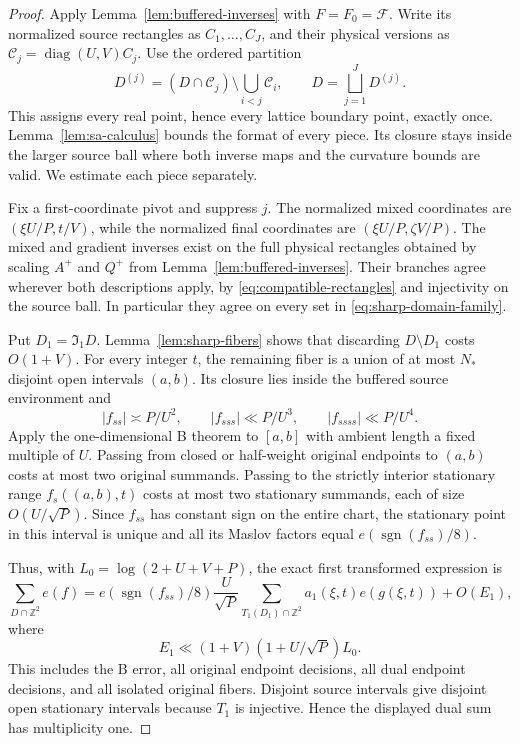 \documentclass[11pt,a4paper]{article}
\numberwithin{equation}{section}
\theoremstyle{remark}
\newcommand{\Z}{\mathbb Z}
\begin{document}
\begin{proof}
Apply Lemma~\ref{lem:buffered-inverses} with $F=F_0=\mathcal F$.
Write its normalized source rectangles as $C_1,\ldots,C_J$, and their
physical versions as $\mathcal C_j=\operatorname{diag}(U,V)C_j$.
Use the ordered partition
\begin{equation}\label{eq:chart-partition}
 D^{(j)}=(D\cap\mathcal C_j)\setminus\bigcup_{i<j}\mathcal C_i,
 \qquad D=\bigsqcup_{j=1}^J D^{(j)}.
\end{equation}
This assigns every real point, hence every lattice boundary point, exactly
once. Lemma~\ref{lem:sa-calculus} bounds the format of every piece.
Its closure stays inside the larger source ball where both inverse maps
and the curvature bounds are valid. We estimate each piece separately.

Fix a first-coordinate pivot and suppress $j$. The normalized mixed
coordinates are $(\xi U/P,t/V)$, while the normalized final coordinates
are $(\xi U/P,\zeta V/P)$. The mixed and gradient inverses exist on the
full physical rectangles obtained by scaling $A^+$ and $Q^+$ from
Lemma~\ref{lem:buffered-inverses}. Their branches agree wherever both
descriptions apply, by \eqref{eq:compatible-rectangles} and injectivity
on the source ball. In particular they agree on every set in
\eqref{eq:sharp-domain-family}.

Put $D_1=\mathfrak I_1D$. Lemma~\ref{lem:sharp-fibers} shows that
discarding $D\setminus D_1$ costs $O(1+V)$. For every integer $t$, the
remaining fiber is a union of at most $N_*$ disjoint open intervals
$(a,b)$. Its closure lies inside the buffered source environment and
\[
 |f_{ss}|\asymp P/U^2,\qquad
 |f_{sss}|\ll P/U^3,\qquad |f_{ssss}|\ll P/U^4.
\]
Apply the one-dimensional B theorem to $[a,b]$ with ambient length a
fixed multiple of $U$. Passing from closed or half-weight original
endpoints to $(a,b)$ costs at most two original summands. Passing to
the strictly interior stationary range $f_s((a,b),t)$ costs at most two
stationary summands, each of size $O(U/\sqrt P)$. Since $f_{ss}$ has
constant sign on the entire chart, the stationary point in this interval
is unique and all its Maslov factors equal $e(\operatorname{sgn}(f_{ss})/8)$.

Thus, with $L_0=\log(2+U+V+P)$, the exact first transformed expression is
\[
 \sum_{D\cap\Z^2}e(f)
 =e(\operatorname{sgn}(f_{ss})/8)\frac U{\sqrt P}
   \sum_{T_1(D_1)\cap\Z^2}a_1(\xi,t)e(g(\xi,t))+O(E_1),
\]
where
\begin{equation}\label{eq:E1}
 E_1\ll(1+V)(1+U/\sqrt P)L_0.
\end{equation}
This includes the B error, all original endpoint decisions, all dual
endpoint decisions, and all isolated original fibers. Disjoint source
intervals give disjoint open stationary intervals because $T_1$ is
injective. Hence the displayed dual sum has multiplicity one.


\end{proof}
\end{document}
